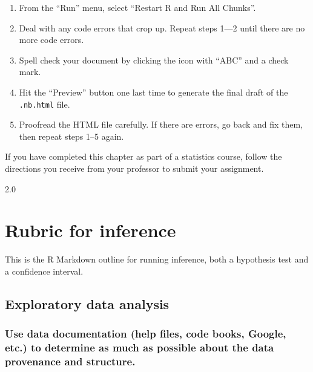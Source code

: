 \documentclass[
]{book}
\providecommand{\tightlist}{%
  \setlength{\itemsep}{0pt}\setlength{\parskip}{0pt}}
\begin{document}
\begin{enumerate}
\def\labelenumi{\arabic{enumi}.}
\tightlist
\item
  From the ``Run'' menu, select ``Restart R and Run All Chunks''.
\item
  Deal with any code errors that crop up. Repeat steps 1---2 until there are no more code errors.
\item
  Spell check your document by clicking the icon with ``ABC'' and a check mark.
\item
  Hit the ``Preview'' button one last time to generate the final draft of the \texttt{.nb.html} file.
\item
  Proofread the HTML file carefully. If there are errors, go back and fix them, then repeat steps 1--5 again.
\end{enumerate}

If you have completed this chapter as part of a statistics course, follow the directions you receive from your professor to submit your assignment.

\hypertarget{appendix-appendix}{%
\appendix}


2.0

\hypertarget{appendix-rubric}{%
\chapter{Rubric for inference}\label{appendix-rubric}}

This is the R Markdown outline for running inference, both a hypothesis test and a confidence interval.

\hypertarget{exploratory-data-analysis-3}{%
\section*{Exploratory data analysis}\label{exploratory-data-analysis-3}}

\hypertarget{use-data-documentation-help-files-code-books-google-etc.-to-determine-as-much-as-possible-about-the-data-provenance-and-structure.-3}{%
\subsection*{Use data documentation (help files, code books, Google, etc.) to determine as much as possible about the data provenance and structure.}\label{use-data-documentation-help-files-code-books-google-etc.-to-determine-as-much-as-possible-about-the-data-provenance-and-structure.-3}}
\end{document}
